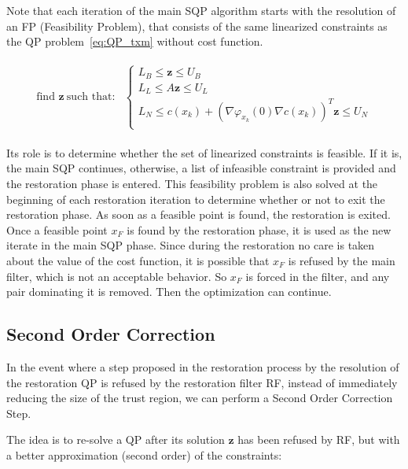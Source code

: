 Note that each iteration of the main SQP algorithm starts with the resolution of an FP (Feasibility Problem), that consists of the same linearized constraints as the QP problem~\ref{eq:QP_txm} without cost function.

\begin{align}
  \label{eq:FP_txm}
  \begin{split}
  \text{find } \mathbf{z}\ \text{such that:}&\left\{
  \begin{array}{lr}
    L_B \leq \mathbf{z} \leq U_B \\
    L_L \leq A \mathbf{z} \leq U_L \\
    L_N \leq c(x_k) + {\left(\nabla\varphi_{x_k}(0) \nabla c (x_k)\right)}^T\mathbf{z}\leq U_N\\
  \end{array}\right.
  \end{split}
\end{align}

Its role is to determine whether the set of linearized constraints is feasible.
If it is, the main SQP continues, otherwise, a list of infeasible constraint is provided and the restoration phase is entered.
This feasibility problem is also solved at the beginning of each restoration iteration to determine whether or not to exit the restoration phase. As soon as a feasible point is found, the restoration is exited.
Once a feasible point $x_F$ is found by the restoration phase, it is used as the new iterate in the main SQP phase.
Since during the restoration no care is taken about the value of the cost function, it is possible that $x_F$ is refused by the main filter, which is not an acceptable behavior.
So $x_F$ is forced in the filter, and any pair dominating it is removed.
Then the optimization can continue.

\subsection{Second Order Correction}
\label{sub:second_order_correction}

In the event where a step proposed in the restoration process by the resolution of the restoration QP is refused by the restoration filter RF, instead of immediately reducing the size of the trust region, we can perform a Second Order Correction Step.

The idea is to re-solve a QP after its solution $\mathbf{z}$ has been refused by RF, but with a better approximation (second order) of the constraints:

